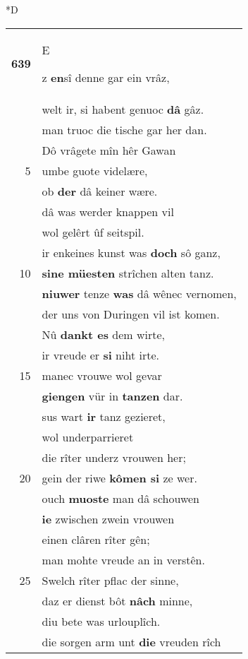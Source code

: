 \documentclass[8pt,a4paper,notitlepage]{article}
\begin{document}
\begin{table}[ht]
\begin{minipage}[t]{0.5\linewidth}
\small
\begin{center}*D
\end{center}
\begin{tabular}{rl}
\textbf{639} & \begin{large}E\end{large}z \textbf{en}sî denne gar ein vrâz,\\ 
 & welt ir, si habent genuoc \textbf{dâ} gâz.\\ 
 & man truoc die tische gar her dan.\\ 
 & Dô vrâgete mîn hêr Gawan\\ 
5 & umbe guote videlære,\\ 
 & ob \textbf{der} dâ keiner wære.\\ 
 & dâ was werder knappen vil\\ 
 & wol gelêrt ûf seitspil.\\ 
 & ir enkeines kunst was \textbf{doch} sô ganz,\\ 
10 & \textbf{sine müesten} strîchen alten tanz.\\ 
 & \textbf{niuwer} tenze \textbf{was} dâ wênec vernomen,\\ 
 & der uns von Duringen vil ist komen.\\ 
 & Nû \textbf{dankt es} dem wirte,\\ 
 & ir vreude er \textbf{si} niht irte.\\ 
15 & manec vrouwe wol gevar\\ 
 & \textbf{giengen} vür in \textbf{tanzen} dar.\\ 
 & sus wart \textbf{ir} tanz gezieret,\\ 
 & wol underparrieret\\ 
 & die rîter underz vrouwen her;\\ 
20 & gein der riwe \textbf{kômen si} ze wer.\\ 
 & ouch \textbf{muoste} man dâ schouwen\\ 
 & \textbf{ie} zwischen zwein vrouwen\\ 
 & einen clâren rîter gên;\\ 
 & man mohte vreude an in verstên.\\ 
25 & Swelch rîter pflac der sinne,\\ 
 & daz er dienst bôt \textbf{nâch} minne,\\ 
 & diu bete was urlouplîch.\\ 
 & die sorgen arm unt \textbf{die} vreuden rîch\\ 

\end{tabular}
\end{minipage}
\end{table}
\end{document}
